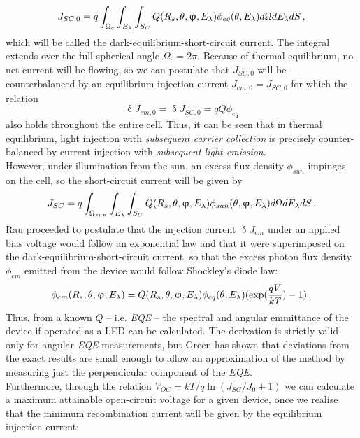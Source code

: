 \begin{equation}
J_{SC,0}=q \int _{\Omega _{c}} \int _{E_{\lambda}} \int _{S_C} Q(R_s, \theta, \upvarphi, E_{\lambda}) \phi_{eq} (\theta, E_{\lambda}) d\Omega dE_{\lambda}dS \, ,
\end{equation}
which will be called the dark-equilibrium-short-circuit current. The integral extends over the full spherical angle $\Omega _{c} = 2\pi$.
Because of thermal equilibrium, no net current will be flowing, so we can postulate that $J_{SC,0}$ will be counterbalanced by an equilibrium injection current $J_{em,0}=J_{SC,0}$ for which the relation
\begin{equation}
\updelta J_{em,0}=\updelta J_{SC,0} = q Q \phi_{eq}
\end{equation}
also holds throughout the entire cell. Thus, it can be seen that in thermal equilibrium, light injection with \emph{subsequent carrier collection} is precisely counter-balanced by current injection with \emph{subsequent light emission}.\\
However, under illumination from the sun, an excess flux density $\phi_{sun}$ impinges on the cell, so the short-circuit current will be given by
\begin{equation}
J_{SC}=q \int _{\Omega _{sun}} \int _{E_{\lambda}} \int _{S_C} Q(R_s, \theta, \upvarphi, E_{\lambda}) \phi_{sun} (\theta , \upvarphi , E_{\lambda}) d\Omega dE_{\lambda}dS \, .
\end{equation}
Rau proceeded to postulate that the injection current $\updelta J_{em}$ under an applied bias voltage would follow an exponential law and that it were superimposed on the dark-equilibrium-short-circuit current, so that the excess photon flux density $\phi_{em}$ emitted from the device would follow Shockley's diode law:
\begin{equation}
\phi_{em}(R_s, \theta, \upvarphi, E_{\lambda})=Q(R_s, \theta, \upvarphi, E_{\lambda}) \phi_{eq} (\theta, E_{\lambda}) (\exp (\frac{qV}{kT})-1) \, .
\end{equation}
Thus, from a known $Q$ -- i.e. \emph{EQE} -- the spectral and angular emmittance of the device if operated as a LED can be calculated. The derivation is strictly valid only for angular \emph{EQE} measurements, but Green has shown that deviations from the exact results are small enough to allow an approximation of the method by measuring just the perpendicular component of the \emph{EQE}.\\
Furthermore, through the relation $V_{OC}=kT/q \ln (J_{SC}/J_0 +1)$ we can calculate a maximum attainable open-circuit voltage for a given device, once we realise that the minimum recombination current will be given by the equilibrium injection current:
